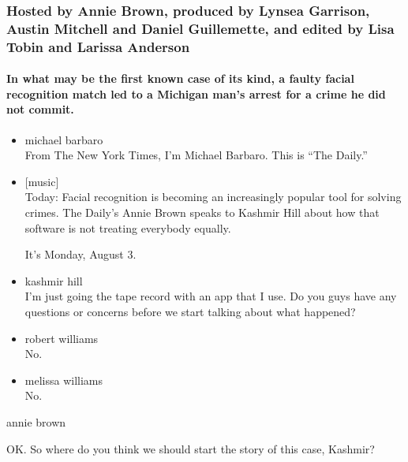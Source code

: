 \hypertarget{hosted-by-annie-brown-produced-by-lynsea-garrison-austin-mitchell-and-daniel-guillemette-and-edited-by-lisa-tobin-and-larissa-anderson}{%
\subsubsection{Hosted by Annie Brown, produced by Lynsea Garrison,
Austin Mitchell and Daniel Guillemette, and edited by Lisa Tobin and
Larissa
Anderson}\label{hosted-by-annie-brown-produced-by-lynsea-garrison-austin-mitchell-and-daniel-guillemette-and-edited-by-lisa-tobin-and-larissa-anderson}}

\hypertarget{in-what-may-be-the-first-known-case-of-its-kind-a-faulty-facial-recognition-match-led-to-a-michigan-mans-arrest-for-a-crime-he-did-not-commit}{%
\paragraph{In what may be the first known case of its kind, a faulty
facial recognition match led to a Michigan man's arrest for a crime he
did not
commit.}\label{in-what-may-be-the-first-known-case-of-its-kind-a-faulty-facial-recognition-match-led-to-a-michigan-mans-arrest-for-a-crime-he-did-not-commit}}

\begin{itemize}
\item
  michael barbaro\\
  From The New York Times, I'm Michael Barbaro. This is ``The Daily.''
\item
  {[}music{]}\\
  Today: Facial recognition is becoming an increasingly popular tool for
  solving crimes. The Daily's Annie Brown speaks to Kashmir Hill about
  how that software is not treating everybody equally.

  It's Monday, August 3.
\item
  kashmir hill\\
  I'm just going the tape record with an app that I use. Do you guys
  have any questions or concerns before we start talking about what
  happened?
\item
  robert williams\\
  No.
\item
  melissa williams\\
  No.
\end{itemize}

annie brown

OK. So where do you think we should start the story of this case,
Kashmir?

